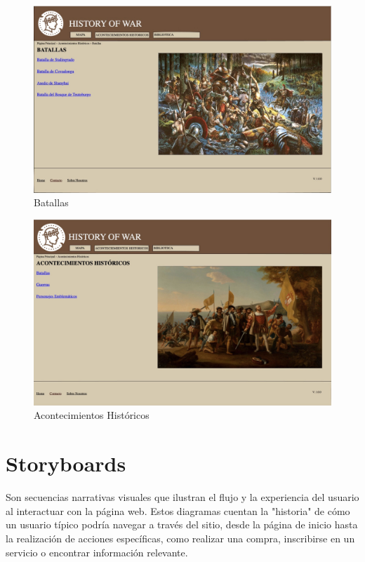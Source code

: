\documentclass{article}
\begin{document}
\begin{figure}[H]
    \centering
    \includegraphics[width=1\textwidth]{Mockup/BatallasMockup.jpg}
    \caption{Batallas}
    \label{fig:mi_imagen}
\end{figure}

\begin{figure}[H]
    \centering
    \includegraphics[width=1\textwidth]{Mockup/AHMockup.jpg}
    \caption{Acontecimientos Históricos}
    \label{fig:mi_imagen}
\end{figure}

\newpage

\section{Storyboards}

Son secuencias narrativas visuales que ilustran el flujo y la experiencia del usuario al interactuar con la página web. Estos diagramas cuentan la "historia" de cómo un usuario típico podría navegar a través del sitio, desde la página de inicio hasta la realización de acciones específicas, como realizar una compra, inscribirse en un servicio o encontrar información relevante.
\end{document}
